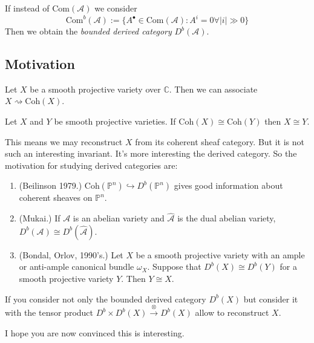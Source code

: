 \begin{definition}
\label{definition-bounded-derived-category}
If instead of $\text{Com}(\mathcal{A})$ we consider
$$
\text{Com}^b(\mathcal{A}):=\{A^{\bullet} \in \text{Com}(\mathcal{A}):
A^i=0\forall  |i|\gg 0\}
$$
Then we obtain the {\it bounded derived category} $D^b(\mathcal{A})$.
\end{definition}

\subsection*{Motivation}
\label{subsection-motivation}

Let $X$ be a smooth projective variety over $\mathbb{C}$. Then
we can associate $X\rightsquigarrow \text{Coh}(X)$.

\begin{theorem}[Gabriel]
\label{theorem-Gabriel}
Let $X$ and $Y$ be smooth projective varieties. If $\text{Coh}(X)\cong
\text{Coh}(Y)$ then $X\cong Y$.
\end{theorem}

This means we may reconstruct $X$ from its coherent sheaf category. But it is
not such an interesting invariant. It's more interesting the derived category.
So the motivation for studying derived categories are:

\begin{enumerate}
\item (Beilinson 1979.) $\text{Coh}(\mathbb{P}^n)\hookrightarrow
D^b(\mathbb{P}^n)$ gives good information about coherent sheaves on
$\mathbb{P}^n$.
\item (Mukai.) If $\mathcal{A}$ is an abelian variety and $\hat{\mathcal{A}}$ is
the dual abelian variety, $D^b(\mathcal{A})\cong D^b(\hat{\mathcal{A}})$.
\item (Bondal, Orlov, 1990's.) Let $X$ be a smooth projective variety with an
ample or anti-ample canonical bundle $\omega_X$. Suppose that $D^b(X)\cong
D^b(Y)$ for a smooth projective variety $Y$. Then $Y \cong X$.
\end{enumerate}

\begin{remark}
\label{remark-derived-category-with-tensor-product}
If you consider not only the bounded derived category $D^b(X)$ but consider it
with the tensor product $D^b \times D^b(X) \xrightarrow{\otimes} D^b(X)$ allow
to reconstruct $X$.
\end{remark}

I hope you are now convinced this is interesting.

